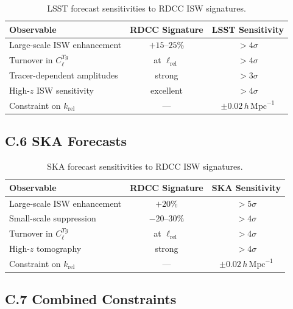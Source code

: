 \documentclass[11pt,a4paper]{article}
\begin{document}
\begin{table}[H]
\centering
\begin{tabular}{lcc}
\hline
\textbf{Observable} & \textbf{RDCC Signature} & \textbf{LSST Sensitivity} \\
\hline
Large-scale ISW enhancement & $+15$--$25\%$ & $>4\sigma$ \\
Turnover in $C_{\ell}^{Tg}$ & at $\ell_{\mathrm{rel}}$ & $>4\sigma$ \\
Tracer-dependent amplitudes & strong & $>3\sigma$ \\
High-$z$ ISW sensitivity & excellent & $>4\sigma$ \\
Constraint on $k_{\mathrm{rel}}$ & --- & $\pm 0.02\,h\,\mathrm{Mpc}^{-1}$ \\
\hline
\end{tabular}
\caption{LSST forecast sensitivities to RDCC ISW signatures.}
\end{table}

\subsection*{C.6 SKA Forecasts}

\begin{table}[H]
\centering
\begin{tabular}{lcc}
\hline
\textbf{Observable} & \textbf{RDCC Signature} & \textbf{SKA Sensitivity} \\
\hline
Large-scale ISW enhancement & $+20\%$ & $>5\sigma$ \\
Small-scale suppression & $-20$--$30\%$ & $>4\sigma$ \\
Turnover in $C_{\ell}^{Tg}$ & at $\ell_{\mathrm{rel}}$ & $>4\sigma$ \\
High-$z$ tomography & strong & $>4\sigma$ \\
Constraint on $k_{\mathrm{rel}}$ & --- & $\pm 0.02\,h\,\mathrm{Mpc}^{-1}$ \\
\hline
\end{tabular}
\caption{SKA forecast sensitivities to RDCC ISW signatures.}
\end{table}

\subsection*{C.7 Combined Constraints}
\end{document}
